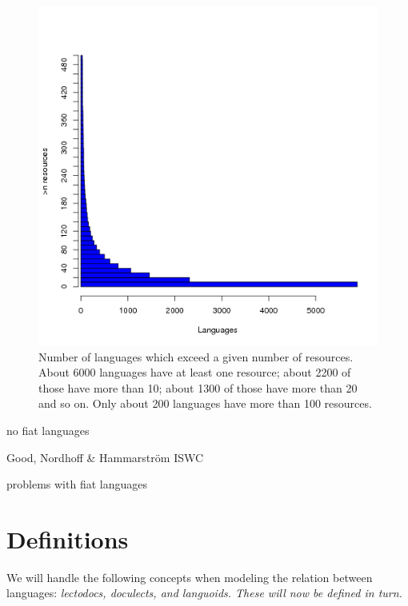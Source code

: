 \documentclass[a4paper,10pt]{article}
\begin{document}
\begin{figure}
\includegraphics[height=.3\textheight]{docstats.png}
\caption{Number of languages which exceed a given number of resources. About 6000 languages have at least one resource; about 2200 of those have more than 10; about 1300 of those have more than 20 and so on. Only about 200 languages have more than 100 resources.}
\label{fig:amountofdocumentation}
\end{figure}


        no fiat languages

        Good, Nordhoff \& Hammarström ISWC

            problems with fiat languages

\section{Definitions}
We will handle the following concepts when modeling the relation between languages: \em lectodocs\em, \em doculects\em, and \em languoids\em. These will now be defined in turn.
\end{document}
